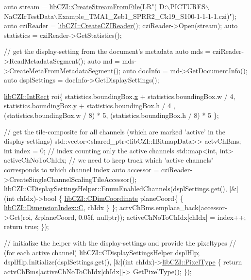 \begin{DoxyCode}
\textcolor{keyword}{auto} stream = \hyperlink{namespacelib_c_z_i_a8783cf40c0eac418632db90c4f20b43b}{libCZI::CreateStreamFromFile}(LR\textcolor{stringliteral}{"(
      D:\(\backslash\)PICTURES\(\backslash\)NaCZIrTestData\(\backslash\)Example\_TMA1\_Zeb1\_SPRR2\_Ck19\_S100-1-1-1-1.czi)");}
\textcolor{stringliteral}{}\textcolor{keyword}{auto} cziReader = \hyperlink{namespacelib_c_z_i_abe978d8bd50abe94c2d37df6212859e8}{libCZI::CreateCZIReader}();
cziReader->Open(stream);
\textcolor{keyword}{auto} statistics = cziReader->GetStatistics();

\textcolor{comment}{// get the display-setting from the document's metadata}
\textcolor{keyword}{auto} mds = cziReader->ReadMetadataSegment();
\textcolor{keyword}{auto} md = mds->CreateMetaFromMetadataSegment();
\textcolor{keyword}{auto} docInfo = md->GetDocumentInfo();
\textcolor{keyword}{auto} dsplSettings = docInfo->GetDisplaySettings();

\hyperlink{structlib_c_z_i_1_1_int_rect}{libCZI::IntRect} roi\{
    statistics.boundingBox.\hyperlink{structlib_c_z_i_1_1_int_rect_a7a1e25fc9f6a4c99d9a3710446b7a5de}{x} + statistics.boundingBox.w / 4,
    statistics.boundingBox.y + statistics.boundingBox.h / 4 ,
    (statistics.boundingBox.w / 8) * 5, (statistics.boundingBox.h / 8) * 5 \};

\textcolor{comment}{// get the tile-composite for all channels (which are marked 'active' in the display-settings)}
std::vector<shared\_ptr<libCZI::IBitmapData>> actvChBms;
\textcolor{keywordtype}{int} index = 0;  \textcolor{comment}{// index counting only the active channels}
std::map<int, int> activeChNoToChIdx;   \textcolor{comment}{// we need to keep track which 'active channels" corresponds to
       which channel index}
\textcolor{keyword}{auto} accessor = cziReader->CreateSingleChannelScalingTileAccessor();
libCZI::CDisplaySettingsHelper::EnumEnabledChannels(dsplSettings.get(),
    [&](\textcolor{keywordtype}{int} chIdx)->\textcolor{keywordtype}{bool}
\{
    \hyperlink{classlib_c_z_i_1_1_c_dim_coordinate}{libCZI::CDimCoordinate} planeCoord\{ \{ 
      \hyperlink{namespacelib_c_z_i_a55049658acf59d0eddfaebcad16df424a0d61f8370cad1d412f80b84d143e1257}{libCZI::DimensionIndex::C}, chIdx \} \};
    actvChBms.emplace\_back(accessor->Get(roi, &planeCoord, 0.05f, \textcolor{keyword}{nullptr}));
    activeChNoToChIdx[chIdx] = index++;
    \textcolor{keywordflow}{return} \textcolor{keyword}{true};
\});

\textcolor{comment}{// initialize the helper with the display-settings and provide the pixeltypes }
\textcolor{comment}{// (for each active channel)}
libCZI::CDisplaySettingsHelper dsplHlp;
dsplHlp.Initialize(dsplSettings.get(), 
    [&](\textcolor{keywordtype}{int} chIdx)->\hyperlink{namespacelib_c_z_i_abf8ce12ab88b06c8b3b47efbb5e2e834}{libCZI::PixelType} \{ \textcolor{keywordflow}{return} actvChBms[activeChNoToChIdx[chIdx]]->
      GetPixelType(); \});


\end{DoxyCode}
